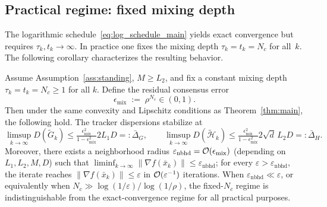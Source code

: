 \documentclass[review,onefignum,onetabnum]{siamart171218}
\begin{document}
\subsection{Practical regime: fixed mixing depth}\label{ssec:fixed_nc}

The logarithmic schedule~\eqref{eq:log_schedule_main} yields exact
convergence but requires $\tau_k,t_k\to\infty$.
In practice one fixes the mixing depth $\tau_k=t_k=N_c$ for all~$k$.
The following corollary characterizes the resulting behavior.

\begin{corollary}\label{cor:fixed_nc}
Assume Assumption~\ref{ass:standing}, $M\ge L_2$, and fix a constant mixing depth $\tau_k=t_k=N_c\ge 1$ for all $k$.
Define the residual consensus error
\[
\epsilon_{\mathrm{mix}} \;:=\; \rho^{N_c}\in(0,1).
\]
Then under the same convexity and Lipschitz conditions as Theorem~\ref{thm:main},
the following hold.
The tracker dispersions stabilize at
\[
	\limsup_{k\to\infty} D(\tilde G_k)
	\le \tfrac{\epsilon_{\mathrm{mix}}^2}{1-\epsilon_{\mathrm{mix}}^2}2L_1D
	=: \bar\Delta_G,
	\qquad
	\limsup_{k\to\infty} D(\tilde{\mathcal H}_k)
	\le \tfrac{\epsilon_{\mathrm{mix}}^2}{1-\epsilon_{\mathrm{mix}}^2}2\sqrt{d}\,L_2D
	=: \bar\Delta_H.
\]
Moreover, there exists a neighborhood radius $\varepsilon_{\mathrm{nbhd}}=\mathcal{O}(\epsilon_{\mathrm{mix}})$
(depending on $L_1,L_2,M,D$) such that
$\liminf_{k\to\infty}\|\nabla f(\bar x_k)\|\le \varepsilon_{\mathrm{nbhd}}$;
for every $\varepsilon>\varepsilon_{\mathrm{nbhd}}$, the iterate reaches
$\|\nabla f(\bar x_k)\|\le \varepsilon$ in $\mathcal{O}(\varepsilon^{-1})$ iterations.
When $\varepsilon_{\mathrm{nbhd}}\ll\varepsilon$,
or equivalently when $N_c\gg \log(1/\varepsilon)/\log(1/\rho)$,
the fixed-$N_c$ regime is indistinguishable from the exact-convergence regime
for all practical purposes.
\end{corollary}
\end{document}
